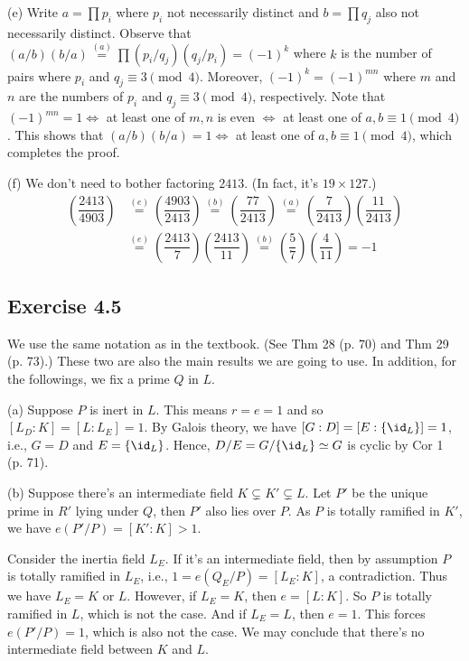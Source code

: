\documentclass[../Chapter.tex]{subfiles}
\begin{document}
(e) Write $a=\prod p_i$ where $p_i$ not necessarily distinct and $b=\prod q_j$ also not necessarily distinct. Observe that $(a/b)(b/a)\overset{(a)}{=}\prod (p_i/q_j)(q_j/p_i)=(-1)^k$ where $k$ is the number of pairs where $p_i$ and $q_j\equiv 3\pmod{4}$. Moreover, $(-1)^k=(-1)^{mn}$ where $m$ and $n$ are the numbers of $p_i$ and $q_j\equiv 3\pmod{4}$, respectively. Note that $(-1)^{mn}=1 \iff$ at least one of $m,n$ is even $\iff$ at least one of $a,b\equiv 1\pmod{4}$. This shows that $(a/b)(b/a)=1 \iff$ at least one of $a,b\equiv 1\pmod{4}$, which completes the proof.

(f) We don't need to bother factoring $2413$. (In fact, it's $19\times 127$.)
\begin{align*}
\left(\dfrac{2413}{4903}\right) &\overset{(e)}{=} \left(\dfrac{4903}{2413}\right) \overset{(b)}{=} \left(\dfrac{77}{2413}\right) \overset{(a)}{=} \left(\dfrac{7}{2413}\right)\left(\dfrac{11}{2413}\right) \\ &\overset{(e)}{=} \left(\dfrac{2413}{7}\right)\left(\dfrac{2413}{11}\right) \overset{(b)}{=} \left(\dfrac{5}{7}\right)\left(\dfrac{4}{11}\right) = -1
\end{align*}


\subsection*{Exercise 4.5}

We use the same notation as in the textbook. (See Thm 28 (p. 70) and Thm 29 (p. 73).) These two are also the main results we are going to use. In addition, for the followings, we fix a prime $Q$ in $L$.

(a) Suppose $P$ is inert in $L$. This means $r=e=1$ and so $[L_D:K]=[L:L_E]=1$. By Galois theory, we have $[G:D]=[E:\{\id_L\}]=1$, i.e., $G=D$ and $E=\{\id_L\}$. Hence, $D/E=G/\{\id_L\}\simeq G$ is cyclic by Cor 1 (p. 71).

(b) Suppose there's an intermediate field $K\varsubsetneq K'\varsubsetneq L$. Let $P'$ be the unique prime in $R'$ lying under $Q$, then $P'$ also lies over $P$. As $P$ is totally ramified in $K'$, we have $e(P'/P)=[K':K]>1$.

Consider the inertia field $L_E$. If it's an intermediate field, then by assumption $P$ is totally ramified in $L_E$, i.e., $1=e(Q_E/P)=[L_E:K]$, a contradiction. Thus we have $L_E=K$ or $L$. However, if $L_E=K$, then $e=[L:K]$. So $P$ is totally ramified in $L$, which is not the case. And if $L_E=L$, then $e=1$. This forces $e(P'/P)=1$, which is also not the case. We may conclude that there's no intermediate field between $K$ and $L$.
\end{document}
